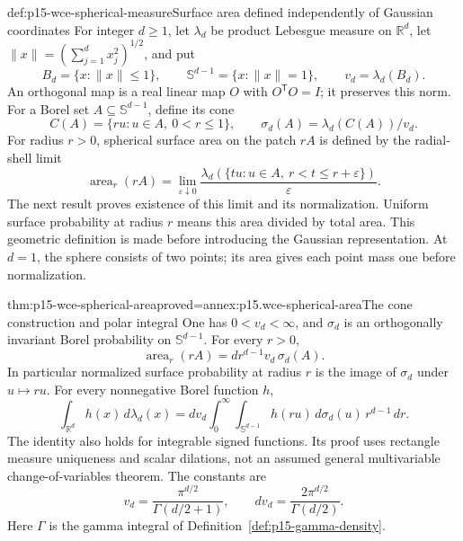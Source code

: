 \begin{hbdefinition}{def:p15-wce-spherical-measure}{Surface area defined independently of Gaussian coordinates}
For integer \(d\geq1\), let \(\lambda_d\) be product Lebesgue
measure on \(\mathbb R^d\), let
\(\|x\|=(\sum_{j=1}^d x_j^2)^{1/2}\), and put
\[
 B_d=\{x:\|x\|\leq1\},\qquad
 \mathbb S^{d-1}=\{x:\|x\|=1\},\qquad v_d=\lambda_d(B_d).
 \]
An orthogonal map is a real linear map \(O\) with
\(O^{\mathsf T}O=I\); it preserves this norm.
For a Borel set \(A\subseteq\mathbb S^{d-1}\), define its cone
\[
 C(A)=\{ru:u\in A,\ 0<r\leq1\},\qquad
 \sigma_d(A)=\lambda_d(C(A))/v_d.
 \]
For radius \(r>0\), spherical surface area on the patch \(rA\)
is defined by the radial-shell limit
\[
 \operatorname{area}_r(rA)=
 \lim_{\varepsilon\downarrow0}
 \frac{\lambda_d(\{tu:u\in A,\ r<t\leq r+\varepsilon\})}
      {\varepsilon}.
 \]
The next result proves existence of this limit and its normalization.
Uniform surface probability at radius \(r\) means this area
divided by total area. This geometric definition is made before
introducing the Gaussian representation.
At \(d=1\), the sphere consists of two points; its area gives
each point mass one before normalization.
\end{hbdefinition}

\begin{hbtheorem}{thm:p15-wce-spherical-area}{proved=annex:p15.wce-spherical-area}{The cone construction and polar integral}
One has \(0<v_d<\infty\), and \(\sigma_d\) is an
orthogonally invariant Borel probability on \(\mathbb S^{d-1}\).
For every \(r>0\),
\[
 \operatorname{area}_r(rA)=d r^{d-1}v_d\,\sigma_d(A).
 \]
In particular normalized surface probability at radius \(r\)
is the image of \(\sigma_d\) under \(u\mapsto ru\).
For every nonnegative Borel function \(h\),
\[
 \int_{\mathbb R^d}h(x)\,d\lambda_d(x)
 =d v_d\int_0^\infty\int_{\mathbb S^{d-1}}
                       h(ru)\,d\sigma_d(u)\,r^{d-1}\,dr.
 \]
The identity also holds for integrable signed functions.
Its proof uses rectangle measure uniqueness and scalar dilations,
not an assumed general multivariable change-of-variables theorem.
The constants are
\[
 v_d=\frac{\pi^{d/2}}{\Gamma(d/2+1)},\qquad
 d v_d=\frac{2\pi^{d/2}}{\Gamma(d/2)}.
 \]
Here \(\Gamma\) is the gamma integral of
Definition~\ref{def:p15-gamma-density}.
\end{hbtheorem}


